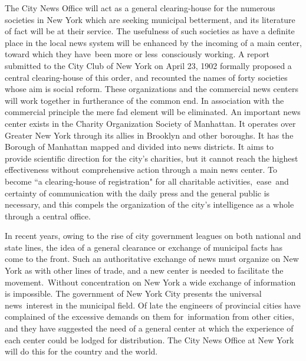 \documentclass[twoside,symmetric,nobib,justified]{tufte-book}
\begin{document}
The City News Office will act as a general clearing-house for the
numerous societies in New York which are seeking municipal betterment,
and its literature of fact will be at their service. The usefulness of
such societies as have a definite place in the local news system will be
enhanced by the incoming of a main center, toward which they have~been
more or less~consciously working. A report submitted to the City Club of
New York on April 23, 1902 formally proposed a central clearing-house of
this order, and recounted the names of forty societies whose aim is
social reform. These organizations and the commercial news centers will
work together in furtherance of the common end. In association with the
commercial principle the mere fad element will be eliminated. An
important news center exists in the Charity Organization Society of
Manhattan. It operates over Greater New York through its allies in
Brooklyn and other boroughs. It has the Borough of Manhattan mapped and
divided into news districts. It aims to provide scientific direction for
the city's charities, but it cannot reach the highest effectiveness
without comprehensive action through a main news center. To become ``a
clearing-house of registration" for all charitable activities,~ease~and
certainty of communication with the daily press and the general public
is necessary, and this compels the organization of the city's
intelligence as a whole through a central office.~

In recent years, owing to the rise of city government leagues on both
national and state lines, the idea of a general clearance or exchange of
municipal facts has come to the front. Such an authoritative exchange of
news must organize on New York as with other lines of trade, and a new
center is needed to facilitate the movement.~Without concentration on
New York a wide exchange of information is impossible. The government of
New York City presents the universal news~interest in the municipal
field. Of late the engineers of provincial cities have complained of the
excessive demands on them for~information from other cities, and they
have suggested the need of a general center at which the experience of
each center could be lodged for distribution. The City News Office at
New York will do this for the country and the world.~
\end{document}
